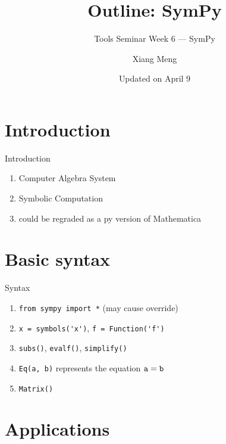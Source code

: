 \documentclass[english, nochinese]{../TeXTemplate/pkuslide}
\title{Outline: SymPy}
\subtitle{Tools Seminar Week 6 --- SymPy}
\author{Xiang Meng}
\date{Updated on April 9}
\begin{document}
\begin{frame}
\titlepage
\end{frame}

\begin{frame}
\tableofcontents[subsectionstyle=hide]
\end{frame}

\section{Introduction}

\begin{frame}
\sectionpage
\end{frame}

\begin{frame}{Introduction}
\begin{enumerate}
\item Computer Algebra System
\item Symbolic Computation
\item could be regraded as a py version of Mathematica
\end{enumerate}
\end{frame}

\section{Basic syntax}

\begin{frame}
\sectionpage
\end{frame}

\begin{frame}[fragile]{Syntax}
\begin{enumerate}
\item \verb"from sympy import *" (may cause override)
\item \verb"x = symbols('x')", \verb"f = Function('f')"
\item \verb"subs()", \verb"evalf()", \verb"simplify()"
\item \verb"Eq(a, b)" represents the equation $ \verb"a" = \verb"b" $
\item \verb"Matrix()"
\end{enumerate}
\end{frame}

\section{Applications}

\begin{frame}
\sectionpage
\end{frame}
\end{document}
